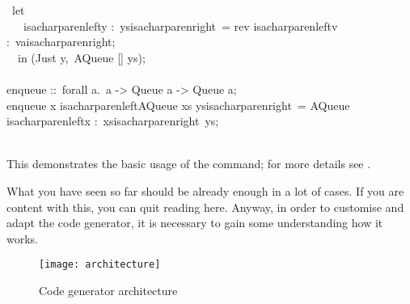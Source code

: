 \begin{isabellebody}
\begin{isamarkuptext}
\hspace*{0pt} ~let {}\\
\hspace*{0pt} ~~~{}{}isacharparenleft{}y :~ys{}{}isacharparenright{}~= rev {}{}isacharparenleft{}v :~va{}{}isacharparenright{};\\
\hspace*{0pt} ~{}~in (Just y,~AQueue [] ys);\\
\hspace*{0pt}\\
\hspace*{0pt}enqueue ::~forall a.~a -> Queue a -> Queue a;\\
\hspace*{0pt}enqueue x {}{}isacharparenleft{}AQueue xs ys{}{}isacharparenright{}~= AQueue {}{}isacharparenleft{}x :~xs{}{}isacharparenright{}~ys;\\
\hspace*{0pt}\\
\hspace*{0pt}{\char125}%
\end{isamarkuptext}%
\isamarkuptrue%
%
\endisatagquote
{\isafoldquote}%
%
\isadelimquote
%
\endisadelimquote
%
\begin{isamarkuptext}%
\noindent This demonstrates the basic usage of the \hyperlink{command.export-code}{\mbox{}} command;
  for more details see .%
\end{isamarkuptext}%
\isamarkuptrue%
%
\isamarkuptrue%
%
\begin{isamarkuptext}%
What you have seen so far should be already enough in a lot of cases.  If you
  are content with this, you can quit reading here.  Anyway, in order to customise
  and adapt the code generator, it is necessary to gain some understanding
  how it works.

  \begin{figure}[h]
    \texttt{[image: architecture]}
    \caption{Code generator architecture}
    \label{fig:arch}
  \end{figure}


\end{isamarkuptext}
\end{isabellebody}
